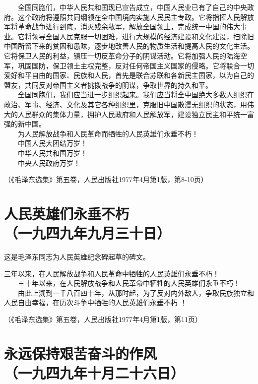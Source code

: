 \documentclass[cn,11pt,chinese]{elegantbook}
\def\myformat#1{\hfil\hfil #1}
\begin{document}
　　全国同胞们，中华人民共和国现已宣告成立，中国人民业已有了自己的中央政府。这个政府将遵照共同纲领在全中国境内实施人民民主专政。它将指挥人民解放军将革命战争进行到底，消灭残余敌军，解放全国领土，完成统一中国的伟大事业。它将领导全国人民克服一切困难，进行大规模的经济建设和文化建设，扫除旧中国所留下来的贫困和愚昧，逐步地改善人民的物质生活和提高人民的文化生活。它将保卫人民的利益，镇压一切反革命分子的阴谋活动。它将加强人民的陆海空军，巩固国防，保卫领土主权完整，反对任何帝国主义国家的侵略。它将联合一切爱好和平自由的国家、民族和人民，首先是联合苏联和各新民主国家，以为自己的盟友，共同反对帝国主义者挑拨战争的阴谋，争取世界的持久和平。\\
　　全国同胞们，我们应当进一步组织起来。我们应当将全中国绝大多数人组织在政治、军事、经济、文化及其它各种组织里，克服旧中国散漫无组织的状态，用伟大的人民群众的集体力量，拥护人民政府和人民解放军，建设独立民主和平统一富强的新中国。\\
　　为人民解放战争和人民革命而牺牲的人民英雄们永垂不朽！\\
　　中国人民大团结万岁！\\
　　中华人民共和国万岁！\\
　　中央人民政府万岁！\\
\begin{flushright}（《毛泽东选集》第五卷，人民出版社1977年4月第1版，第8-10页）\end{flushright}
\newpage\section*{\myformat{人民英雄们永垂不朽}\\\myformat{（一九四九年九月三十日）}}
\begin{introduction}\item  这是毛泽东同志为人民英雄纪念碑起草的碑文。\end{introduction}
三年以来，在人民解放战争和人民革命中牺牲的人民英雄们永垂不朽！\\
　　三十年以来，在人民解放战争和人民革命中牺牲的人民英雄们永垂不朽！\\
　　由此上溯到一千八百四十年，从那时起，为了反对内外敌人，争取民族独立和人民自由幸福，在历次斗争中牺牲的人民英雄们永垂不朽 ！\\
\begin{flushright}（《毛泽东选集》第五卷，人民出版社1977年4月第1版，第11页）\end{flushright}
\newpage\section*{\myformat{永远保持艰苦奋斗的作风}\\\myformat{（一九四九年十月二十六日）}}\\~\\
\end{document}
